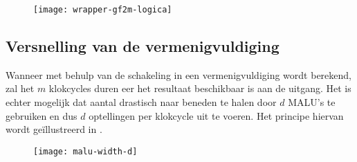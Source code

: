 \begin{figure}[h]
	\begin{center}
		\texttt{[image: wrapper-gf2m-logica]}
		\label{figuur-implementatie-wrapper-gf2m-logica}
	\end{center}
\end{figure}




\subsection{Versnelling van de vermenigvuldiging}\label{subsectie-implementatie-gf2m-versnelling}

Wanneer met behulp van de schakeling in  een vermenigvuldiging wordt berekend, zal het $m$ klokcycles duren eer het resultaat beschikbaar is aan de uitgang. Het is echter mogelijk dat aantal drastisch naar beneden te halen door $d$ MALU's te gebruiken en dus $d$ optellingen per klokcycle uit te voeren. Het principe hiervan wordt ge\"illustreerd in .

\begin{figure}[h]
	\begin{center}
		\texttt{[image: malu-width-d]}
		\label{figuur-implementatie-wrapper-gf2m-d}
	\end{center}
\end{figure}

